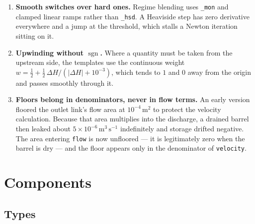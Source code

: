 \documentclass[11pt,a4paper]{article}
\newcommand{\code}[1]{\texttt{\small #1}}
\begin{document}
\begin{enumerate}[leftmargin=1.5em]
\item \textbf{Smooth switches over hard ones.} Regime blending uses
      \code{\_mon} and clamped linear ramps rather than \code{\_hsd}. A
      Heaviside step has zero derivative everywhere and a jump at the
      threshold, which stalls a Newton iteration sitting on it.

\item \textbf{Upwinding without $\operatorname{sgn}$.} Where a quantity must be
      taken from the upstream side, the templates use the continuous weight
      $w=\tfrac12+\tfrac12\,\Delta H/(|\Delta H|+10^{-3})$, which tends to $1$
      and $0$ away from the origin and passes smoothly through it.

\item \textbf{Floors belong in denominators, never in flow terms.} An early
      version floored the outlet link's flow area at $10^{-4}\,\mathrm{m^2}$ to
      protect the velocity calculation. Because that area multiplies into the
      discharge, a drained barrel then leaked about
      $5\times10^{-6}\,\mathrm{m^3\,s^{-1}}$ indefinitely and storage drifted
      negative. The area entering \code{flow} is now unfloored --- it is
      legitimately zero when the barrel is dry --- and the floor appears only
      in the denominator of \code{velocity}.
\end{enumerate}

\section{Components}

\subsection{Types}
\end{document}
